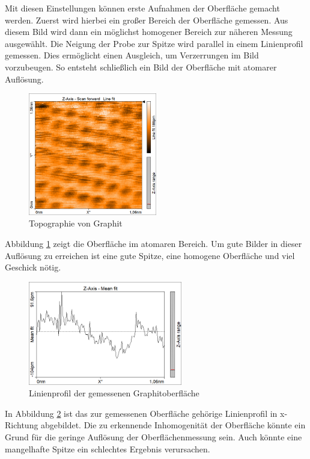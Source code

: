 Mit diesen Einstellungen können erste Aufnahmen der Oberfläche gemacht werden.
Zuerst wird hierbei ein großer Bereich der Oberfläche gemessen. Aus diesem
Bild wird dann ein möglichst homogener Bereich zur näheren Messung ausgewählt.
Die Neigung der Probe zur Spitze wird parallel in einem Linienprofil gemessen.
Dies ermöglicht einen Ausgleich, um Verzerrungen im Bild vorzubeugen.
So entsteht schließlich ein Bild der Oberfläche mit atomarer Auflösung.
\begin{figure}[H]
    \centering
    \includegraphics[width=0.5\textwidth]{Mess/graphit_oberfl.png}
    \caption{Topographie von Graphit}
    \label{topo_graphit}
\end{figure}
Abbildung \ref{topo_graphit} zeigt die Oberfläche im atomaren Bereich.
Um gute Bilder in dieser Auflösung zu erreichen ist eine gute Spitze, eine
homogene Oberfläche und viel Geschick nötig. 
\begin{figure}[h]
    \centering
    \includegraphics[width=0.6\textwidth]{Mess/graphit_linienprofil.png}
    \caption{Linienprofil der gemessenen Graphitoberfläche}
    \label{graprof}
\end{figure}
In Abbildung \ref{graprof} ist das zur gemessenen Oberfläche gehörige Linienprofil
in x-Richtung abgebildet. 
Die zu erkennende Inhomogenität der Oberfläche könnte ein Grund für die 
geringe Auflösung der Oberflächenmessung sein. Auch könnte eine mangelhafte
Spitze ein schlechtes Ergebnis verursachen.

